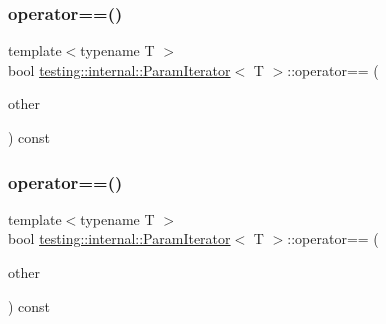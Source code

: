 \mbox{\label{classtesting_1_1internal_1_1_param_iterator_adc356b4789eb0c2a1b5b033c7874e5a6}} 
\subsubsection{\texorpdfstring{operator==()}{operator==()}\hspace{0.1cm}{\footnotesize\ttfamily [1/3]}}
{\footnotesize\ttfamily template$<$typename T $>$ \\
bool \mbox{\hyperlink{classtesting_1_1internal_1_1_param_iterator}{testing\+::internal\+::\+Param\+Iterator}}$<$ T $>$\+::operator== (\begin{DoxyParamCaption}\item[{const \mbox{\hyperlink{classtesting_1_1internal_1_1_param_iterator}{Param\+Iterator}}$<$ T $>$ \&}]{other }\end{DoxyParamCaption}) const\hspace{0.3cm}{\ttfamily [inline]}}

\mbox{\label{classtesting_1_1internal_1_1_param_iterator_adc356b4789eb0c2a1b5b033c7874e5a6}} 
\subsubsection{\texorpdfstring{operator==()}{operator==()}\hspace{0.1cm}{\footnotesize\ttfamily [2/3]}}
{\footnotesize\ttfamily template$<$typename T $>$ \\
bool \mbox{\hyperlink{classtesting_1_1internal_1_1_param_iterator}{testing\+::internal\+::\+Param\+Iterator}}$<$ T $>$\+::operator== (\begin{DoxyParamCaption}\item[{const \mbox{\hyperlink{classtesting_1_1internal_1_1_param_iterator}{Param\+Iterator}}$<$ T $>$ \&}]{other }\end{DoxyParamCaption}) const\hspace{0.3cm}{\ttfamily [inline]}}

